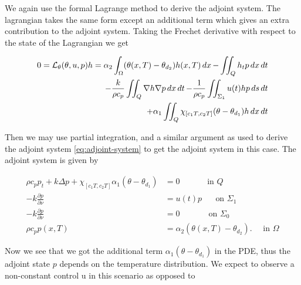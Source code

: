 We again use the formal Lagrange method to derive the adjoint system. The lagrangian takes the same form except an additional term which gives an extra contribution to the adjoint system. Taking the Frechet derivative with respect to the state of the Lagrangian we get

\begin{equation}
  \begin{aligned}
  0 = \mathcal{L}_\theta(\theta, u, p)h = \alpha_2 \int_\Omega (\theta(x,T) - \theta_{d_2})h(x, T)\mathop{dx} - \iint_Q h_t p\mathop{dx}\mathop{dt} \\
  - \frac{k}{\rho c_p}\iint_Q\nabla h\nabla p \mathop{dx}\mathop{dt}
  - \frac{1}{\rho c_p}\iint_{\Sigma_1} u(t)h p\mathop{ds}\mathop{dt} \\
  + \alpha_1 \iint_{Q}\chi_{[c_1T,c_2T]}(\theta - \theta_{d_1})h \mathop{dx}\mathop{dt}
  \end{aligned}
\end{equation}

Then we may use partial integration, and a similar argument as used to derive the adjoint system \eqref{eq:adjoint-system} to get the adjoint system in this case. The adjoint system is given by 

\begin{subequations}
   \begin{align*} 
      \rho c_p p_t + k\Delta p + \chi_{[c_1T,c_2T]}\alpha_1(\theta - \theta_{d_1})&= 0 \quad\qquad\textrm{ in } Q  \\
      {-k}\frac{\partial p}{\partial\nu} &= u(t)p \,\,\quad\textrm{ on } \Sigma_1  \\
      {-k}\frac{\partial p}{\partial\nu} &= 0 \,\quad\qquad\textrm{ on } \Sigma_0  \\
      \rho c_p p(x, T) &= \alpha_2(\theta(x, T) - \theta_{d_2}). \quad \textrm{ in } \Omega
   \end{align*}
\end{subequations}

Now we see that we got the additional term $\alpha_1(\theta-\theta_{d_1})$ in the PDE, thus the adjoint state $p$ depends on the temperature distribution. We expect to observe a non-constant control u in this scenario as opposed to  